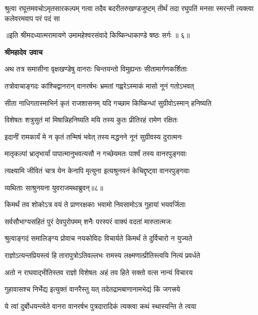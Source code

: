\fourlineindentedshloka
{श्रुत्वा रघूत्तमवचोऽमृतसारकल्पम्}
{गत्वा तदैव बदरीतरुखण्डजुष्टम्}
{तीर्थं तदा रघुपतिं मनसा स्मरन्ती}
{त्यक्त्वा कलेवरमवाप परं पदं सा} %

{॥इति श्रीमदध्यात्मरामायणे उमामहेश्वरसंवादे किष्किन्धाकाण्डे
षष्ठः सर्गः ॥ ६॥
}




\textbf{श्रीमहादेव उवाच}

\twolineshloka
{अथ तत्र समासीना वृक्षखण्डेषु वानराः}
{चिन्तयन्तो विमुह्यन्तः सीतामार्गणकर्शिताः} %

\twolineshloka
{तत्रोवाचाङ्गदः कांश्चिद्वानरान् वानरर्षभः}
{भ्रमतां गह्वरेऽस्माकं मासो नूनं गतोऽभवत्} %

\twolineshloka
{सीता नाधिगतास्माभिर्न कृतं राजशासनम्}
{यदि गच्छाम किष्किन्धां सुग्रीवोऽस्मान् हनिष्यति} %

\twolineshloka
{विशेषतः शत्रुसुतं मां मिषान्निहनिष्यति}
{मयि तस्य कुतः प्रीतिरहं रामेण रक्षितः} %

\twolineshloka
{इदानीं रामकार्यं मे न कृतं तन्मिषं भवेत्}
{तस्य मद्धनने नूनं सुग्रीवस्य दुरात्मनः} %

\twolineshloka
{मातृकल्पां भ्रातृभार्यां पापात्मानुभवत्यसौ}
{न गच्छेयमतः पार्श्वं तस्य वानरपुङ्गवाः} %

\twolineshloka
{त्यक्ष्यामि जीवितं चात्र येन केनापि मृत्युना}
{इत्यश्रुनयनं केचिद्दृष्ट्वा वानरपुङ्गवाः} %

{व्यथिताः साश्रुनयना युवराजमथाब्रुवन्॥८॥} %


\twolineshloka
{किमर्थं तव शोकोऽत्र वयं ते प्राणरक्षकाः}
{भवामो निवसामोऽत्र गुहायां भयवर्जिताः} %

\twolineshloka
{सर्वसौभाग्यसहितं पुरं देवपुरोपमम्}
{शनैः परस्परं वाक्यं वदतां मारुतात्मजः} %

\twolineshloka
{श्रुत्वाङ्गदं समालिङ्ग्य प्रोवाच नयकोविदः}
{विचार्यते किमर्थं ते दुर्विचारो न युज्यते} %

\twolineshloka
{राज्ञोऽत्यन्तप्रियस्त्वं हि तारापुत्रोऽतिवल्लभः}
{रामस्य लक्ष्मणात्प्रीतिस्त्वयि नित्यं प्रवर्धते} %

\twolineshloka
{अतो न राघवाद्भीतिस्तव राज्ञो विशेषतः}
{अहं तव हिते सक्तो वत्स नान्यं विचारय} %

\twolineshloka
{गुहावासश्च निर्भेद्य इत्युक्तं वानरैस्तु यत्}
{तदेतद्रामबाणानामभेद्यं किं जगत्त्रये} %

\twolineshloka
{ये त्वां दुर्बोधयन्त्येते वानरा वानरर्षभ}
{पुत्रदारादिकं त्यक्त्वा कथं स्थास्यन्ति ते त्वया} %

